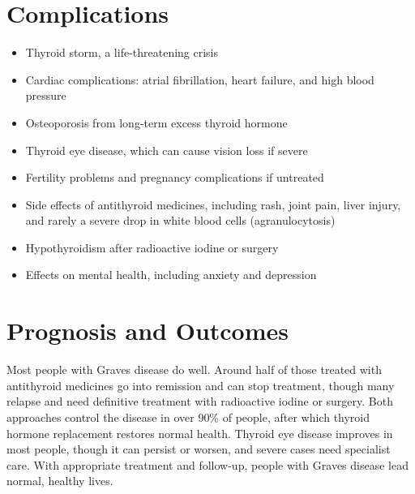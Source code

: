 \section*{Complications}
\begin{itemize}
    \item Thyroid storm, a life-threatening crisis
    \item Cardiac complications: atrial fibrillation, heart failure, and high blood pressure
    \item Osteoporosis from long-term excess thyroid hormone
    \item Thyroid eye disease, which can cause vision loss if severe
    \item Fertility problems and pregnancy complications if untreated
    \item Side effects of antithyroid medicines, including rash, joint pain, liver injury, and rarely a severe drop in white blood cells (agranulocytosis)
    \item Hypothyroidism after radioactive iodine or surgery
    \item Effects on mental health, including anxiety and depression
\end{itemize}

\section*{Prognosis and Outcomes}
Most people with Graves disease do well. Around half of those treated with antithyroid medicines go into remission and can stop treatment, though many relapse and need definitive treatment with radioactive iodine or surgery. Both approaches control the disease in over 90\% of people, after which thyroid hormone replacement restores normal health. Thyroid eye disease improves in most people, though it can persist or worsen, and severe cases need specialist care. With appropriate treatment and follow-up, people with Graves disease lead normal, healthy lives.

